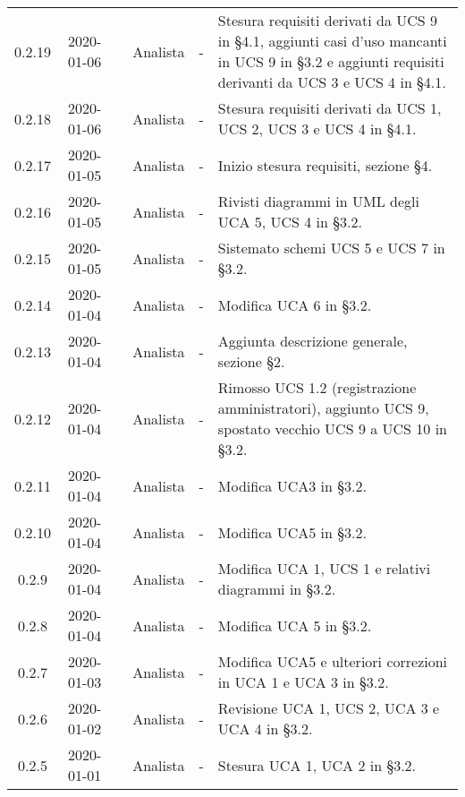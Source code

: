 {\begin{longtable}{ c c  C{2.5cm} c c C{3.5cm}}
0.2.19 & 2020-01-06 & \DF{} & Analista & - & Stesura requisiti derivati da UCS 9 in §4.1, aggiunti casi d'uso mancanti in UCS 9 in §3.2 e aggiunti requisiti derivanti da UCS 3 e UCS 4 in §4.1. \\

0.2.18 & 2020-01-06 & \CE{} & Analista & - & Stesura requisiti derivati da UCS 1, UCS 2, UCS 3 e UCS 4 in §4.1. \\

0.2.17 & 2020-01-05 & \CE{} & Analista & - & Inizio stesura requisiti, sezione §4. \\

0.2.16 & 2020-01-05 & \DF{} & Analista & - & Rivisti diagrammi in UML degli UCA 5, UCS 4 in §3.2. \\

0.2.15 & 2020-01-05 & \PF{} & Analista & - & Sistemato schemi UCS 5 e UCS 7 in §3.2. \\

0.2.14 & 2020-01-04 & \PF{} & Analista & - & Modifica UCA 6 in §3.2. \\

0.2.13 & 2020-01-04 & \CE{} & Analista & - & Aggiunta descrizione generale, sezione §2. \\

0.2.12 & 2020-01-04 & \CE{} & Analista & - & Rimosso UCS 1.2 (registrazione amministratori), aggiunto UCS 9, spostato vecchio UCS 9 a UCS 10 in §3.2. \\

0.2.11 & 2020-01-04 & \PF{} & Analista & - & Modifica UCA3 in §3.2. \\

0.2.10 & 2020-01-04 & \DF{} & Analista & - & Modifica UCA5 in §3.2. \\

0.2.9 & 2020-01-04 & \DF{} & Analista & - & Modifica UCA 1, UCS 1 e relativi diagrammi in §3.2. \\

0.2.8 & 2020-01-04 & \CE{} & Analista & - & Modifica UCA 5 in §3.2. \\

0.2.7 & 2020-01-03 & \CE{} & Analista & - & Modifica UCA5 e ulteriori correzioni in UCA 1 e UCA 3 in §3.2. \\

0.2.6 & 2020-01-02 & \CE{} & Analista & - & Revisione UCA 1, UCS 2, UCA 3 e UCA 4 in §3.2. \\

0.2.5 & 2020-01-01 & \BR{} & Analista & - & Stesura UCA 1, UCA 2 in §3.2. \\


\end{longtable}}
